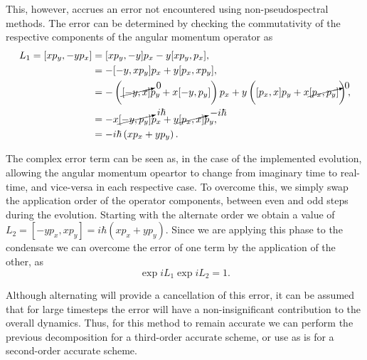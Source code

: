  This, however, accrues an error not encountered using non-pseudospectral methods. The error can be determined by checking the commutativity of the respective components of the angular momentum operator as
 \begin{align}
 	L_1 = [x p_y,-y p_x] &= [x p_y,-y] p_x  -  y[x p_y,p_x], \\
 				   &= -[-y,x p_y] p_x + y [p_x, x p_y], \\
 				   &= -\left( {\cancelto{0}{[-y,x]}} p_y + x [-y,p_y] \right) p_x + y \left( [p_x,x] p_y + x {\cancelto{0}{[p_x,p_y]}} \right), \\
 				   &= -x {\cancelto{i\hbar}{[-y, p_y]}} p_x + y {\cancelto{-i\hbar}{[p_x,x]}} p_y, \\
 				   &= -i\hbar \left(x p_x + y p_y \right).
 \end{align}

 The complex error term can be seen as, in the case of the implemented evolution, allowing the angular momentum opeartor to change from imaginary time to real-time, and vice-versa in each respective case. To overcome this, we simply swap the application order of the operator components, between even and odd steps during the evolution. Starting with the alternate order we obtain a value of $L_2 = [-y p_x, x p_y] = i\hbar \left(x p_x + y p_y \right)$. Since we are applying this phase to the condensate we can overcome the error of one term by the application of the other, as
 \begin{equation}
 \exp{i L_1}\exp{i L_2} = 1.
 \end{equation}

 Although alternating will provide a cancellation of this error, it can be assumed that for large timesteps the error will have a non-insignificant contribution to the overall dynamics. Thus, for this method to remain accurate we can perform the previous decomposition for a third-order accurate scheme, or use as is for a second-order accurate scheme.

